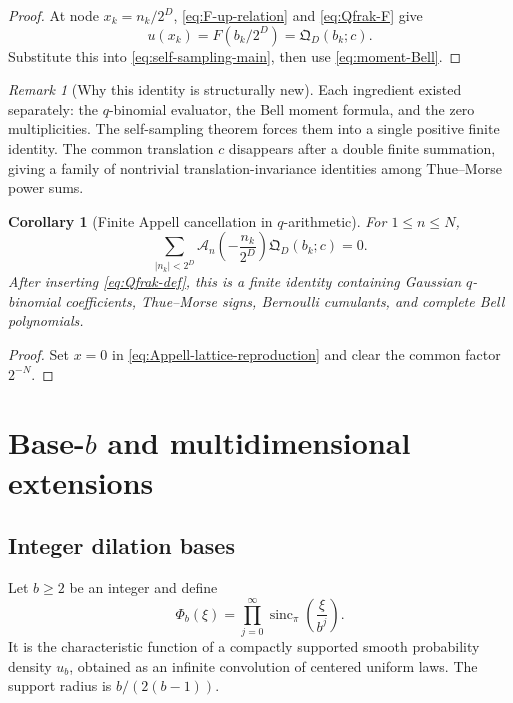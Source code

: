\documentclass[11pt]{article}
\numberwithin{equation}{section}
\newtheorem{corollary}[theorem]{Corollary}
\theoremstyle{definition}
\theoremstyle{remark}
\newtheorem{remark}[theorem]{Remark}
\newcommand{\sincpi}{\operatorname{sinc}_{\pi}}
\newcommand{\abs}[1]{\left|#1\right|}
\newcommand{\Acal}{\mathscr A}
\begin{document}
\begin{proof}
At node $x_k=n_k/2^D$, \eqref{eq:F-up-relation} and \eqref{eq:Qfrak-F} give
\[
 u(x_k)=F(b_k/2^D)=\mathfrak Q_D(b_k;c).
\]
Substitute this into \eqref{eq:self-sampling-main}, then use \eqref{eq:moment-Bell}.
\end{proof}

\begin{remark}[Why this identity is structurally new]
Each ingredient existed separately: the $q$-binomial evaluator, the Bell moment formula, and the zero multiplicities.  The self-sampling theorem forces them into a single positive finite identity.  The common translation $c$ disappears after a double finite summation, giving a family of nontrivial translation-invariance identities among Thue--Morse power sums.
\end{remark}

\begin{corollary}[Finite Appell cancellation in $q$-arithmetic]
\label{cor:q-Appell-cancellation}
For $1\le n\le N$,
\begin{equation}
 \sum_{\abs{n_k}<2^D}
 \Acal_n\!\left(-\frac{n_k}{2^D}\right)
 \mathfrak Q_D(b_k;c)=0.
 \label{eq:q-Appell-cancellation}
\end{equation}
After inserting \eqref{eq:Qfrak-def}, this is a finite identity containing Gaussian $q$-binomial coefficients, Thue--Morse signs, Bernoulli cumulants, and complete Bell polynomials.
\end{corollary}

\begin{proof}
Set $x=0$ in \eqref{eq:Appell-lattice-reproduction} and clear the common factor $2^{-N}$.
\end{proof}

\section{Base-$b$ and multidimensional extensions}
\label{sec:extensions}

\subsection{Integer dilation bases}

Let $b\ge2$ be an integer and define
\begin{equation}
 \Phi_b(\xi)=\prod_{j=0}^{\infty}
 \sincpi\!\left(\frac{\xi}{b^j}\right).
 \label{eq:Phi-b}
\end{equation}
It is the characteristic function of a compactly supported smooth probability density $u_b$, obtained as an infinite convolution of centered uniform laws.  The support radius is $b/(2(b-1))$.
\end{document}
